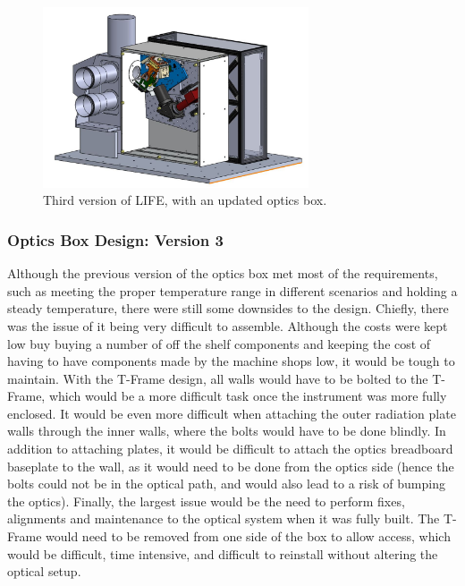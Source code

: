 \begin{figure}
    \centering
    \includegraphics[width=0.7\textwidth]{chap3_images/LIFE_V3_images/LIFE_V3.JPG}
    \caption{Third version of LIFE, with an updated optics box.}
    \label{fig:LIFE_V3}
\end{figure}

\subsubsection{Optics Box Design: Version 3}
Although the previous version of the optics box met most of the requirements, such as meeting the proper temperature range in different scenarios and holding a steady temperature, there were still some downsides to the design. Chiefly, there was the issue of it being very difficult to assemble. Although the costs were kept low buy buying a number of off the shelf components and keeping the cost of having to have components made by the machine shops low, it would be tough to maintain. With the T-Frame design, all walls would have to be bolted to the T-Frame, which would be a more difficult task once the instrument was more fully enclosed. It would be even more difficult when attaching the outer radiation plate walls through the inner walls, where the bolts would have to be done blindly. In addition to attaching plates, it would be difficult to attach the optics breadboard baseplate to the wall, as it would need to be done from the optics side (hence the bolts could not be in the optical path, and would also lead to a risk of bumping the optics). Finally, the largest issue would be the need to perform fixes, alignments and maintenance to the optical system when it was fully built. The T-Frame would need to be removed from one side of the box to allow access, which would be difficult, time intensive, and difficult to reinstall without altering the optical setup.

